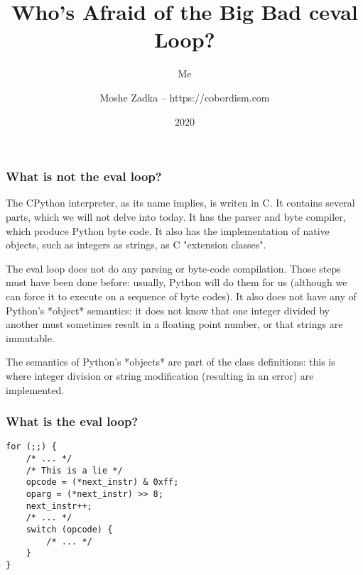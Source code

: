 \usepackage{hyperref}
\usepackage{graphicx}
\usepackage{listings}
\usepackage{textcomp}
\usepackage{fancyvrb}


\title{Who's Afraid of the Big Bad ceval Loop?}
\subtitle{Me}
\author{Moshe Zadka -- https://cobordism.com}
\date{2020}


\begin{titlepage}
\maketitle
\end{titlepage}

\frame{\titlepage}

\begin{frame}
\frametitle{What is not the eval loop?}
\end{frame}

The CPython interpreter,
as its name implies,
is writen in C.
It contains several parts,
which we will not delve into today.
It has the parser and byte compiler,
which produce Python byte code.
It also has the implementation of
native objects,
such as integers as strings,
as C
"extension classes".

The eval loop does not do any parsing or byte-code compilation.
Those steps must have been done before:
usually,
Python will do them for us
(although we can force it to execute on a sequence
of byte codes).
It also does not have any of Python's
*object*
semantics:
it does not know that one integer divided by another must sometimes
result in a floating point number,
or that strings are immutable.

The semantics of Python's
*objects*
are part of the class definitions:
this is where integer division
or string modification
(resulting in an error)
are implemented.

\begin{frame}[fragile]
\frametitle{What is the eval loop?}

\begin{lstlisting}
for (;;) {
    /* ... */
    /* This is a lie */
    opcode = (*next_instr) & 0xff;
    oparg = (*next_instr) >> 8;
    next_instr++;
    /* ... */
    switch (opcode) {
        /* ... */
    }
}
\end{lstlisting}

\end{frame}

